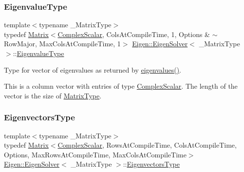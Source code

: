\subsubsection{\texorpdfstring{EigenvalueType}{EigenvalueType}}
{\footnotesize\ttfamily template$<$typename \+\_\+\+Matrix\+Type$>$ \\
typedef \mbox{\hyperlink{class_eigen_1_1_matrix}{Matrix}}$<$\mbox{\hyperlink{class_eigen_1_1_eigen_solver_a4d0b2a773357d0a6ec98e026f04002ed}{Complex\+Scalar}}, Cols\+At\+Compile\+Time, 1, Options \& $\sim$Row\+Major, Max\+Cols\+At\+Compile\+Time, 1$>$ \mbox{\hyperlink{class_eigen_1_1_eigen_solver}{Eigen\+::\+Eigen\+Solver}}$<$ \+\_\+\+Matrix\+Type $>$\+::\mbox{\hyperlink{class_eigen_1_1_eigen_solver_adc446bcb60572758fa64515f2825db62}{Eigenvalue\+Type}}}



Type for vector of eigenvalues as returned by \mbox{\hyperlink{class_eigen_1_1_eigen_solver_a114189009e42f5e03372a7a3dfa33b97}{eigenvalues()}}. 

This is a column vector with entries of type \mbox{\hyperlink{class_eigen_1_1_eigen_solver_a4d0b2a773357d0a6ec98e026f04002ed}{Complex\+Scalar}}. The length of the vector is the size of \mbox{\hyperlink{class_eigen_1_1_eigen_solver_a83acd180404ddaac8a678fa65a6b632b}{Matrix\+Type}}. \mbox{\label{class_eigen_1_1_eigen_solver_aa140354e2f7d5ce34c6488c39e19f2c2}} 
\subsubsection{\texorpdfstring{EigenvectorsType}{EigenvectorsType}}
{\footnotesize\ttfamily template$<$typename \+\_\+\+Matrix\+Type$>$ \\
typedef \mbox{\hyperlink{class_eigen_1_1_matrix}{Matrix}}$<$\mbox{\hyperlink{class_eigen_1_1_eigen_solver_a4d0b2a773357d0a6ec98e026f04002ed}{Complex\+Scalar}}, Rows\+At\+Compile\+Time, Cols\+At\+Compile\+Time, Options, Max\+Rows\+At\+Compile\+Time, Max\+Cols\+At\+Compile\+Time$>$ \mbox{\hyperlink{class_eigen_1_1_eigen_solver}{Eigen\+::\+Eigen\+Solver}}$<$ \+\_\+\+Matrix\+Type $>$\+::\mbox{\hyperlink{class_eigen_1_1_eigen_solver_aa140354e2f7d5ce34c6488c39e19f2c2}{Eigenvectors\+Type}}}



